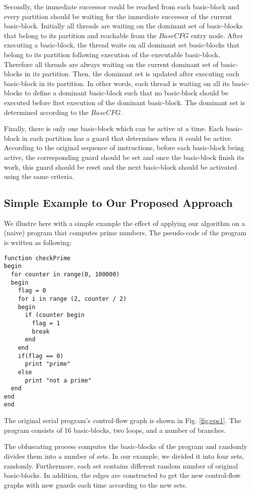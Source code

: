 \documentclass[3p,times,procedia,twocolumn,letterpaper]{elsarticle}
\begin{document}
Secondly, the immediate successor could be reached from each basic-block and every partition should be waiting for the immediate successor of the current basic-block. Initially all threads are waiting on the dominant set of basic-blocks that belong to its partition and reachable from the $BaseCFG$ entry node. After executing a basic-block, the thread waits on all dominant set basic-blocks that belong to its partition following execution of the executable basic-block. Therefore all threads are always waiting on the current dominant set of basic-blocks in its partition. Then, the dominant set is updated after executing each basic-block in its partition. In other words, each thread is waiting on all its basic-blocks to define a dominant basic-block such that no basic-block should be executed before first execution of the dominant basic-block. The dominant set is determined according to the $BaseCFG$.

Finally, there is only one basic-block which can be active at a time. Each basic-block in each partition has a guard that determines when it could be active. According to the original sequence of instructions, before each basic-block being active, the corresponding guard should be set and once the basic-block finish its work, this guard should be reset and the next basic-block should be activated using the same criteria.

\subsection{Simple Example to Our Proposed Approach}
\label{example}
We illustre here with a simple example the effect of applying our algorithm on a (naive) program that computes prime numbers. The pseudo-code of the program is written as following:
\noindent
\small
\begin{verbatim}
function checkPrime
begin
  for counter in range(0, 100000)
  begin
    flag = 0
    for i in range (2, counter / 2)
    begin
      if (counter begin
      	flag = 1
      	break
      end
    end
    if(flag == 0)
      print "prime"
    else
      print "not a prime"
  end
end
end
 \end{verbatim}
\noindent
\normalsize

The original serial program's control-flow graph is shown in Fig. \ref{fig:eps1}. The program consists of 16 basic-blocks, two loops, and a number of branches.

The obfuscating process computes the basic-blocks of the program and randomly divides them into a number of sets. In our example, we divided it into four sets, randomly. Furthermore, each set contains different random number of original basic-blocks. In addition, the edges are constructed to get the new control-flow graphs with new guards each time according to the new sets. 
\end{document}
